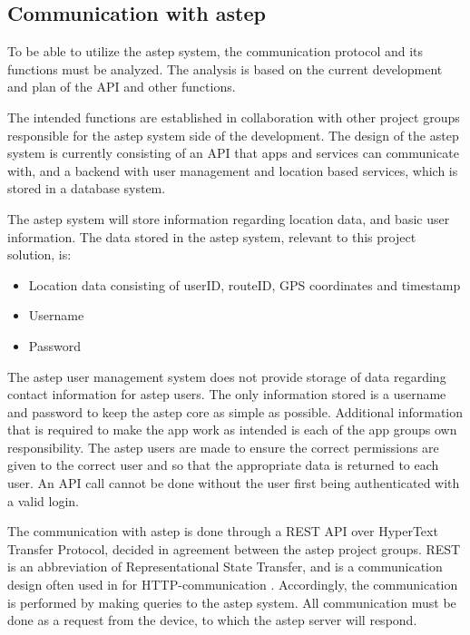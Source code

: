 \subsection{Communication with \gls{astep}}\label{ssec:communicationwithastep}
To be able to utilize the \gls{astep} system, the communication protocol and its functions must be analyzed. 
The analysis is based on the current development and plan of the API and other functions.

The intended functions are established in collaboration with other project groups responsible for the \gls{astep} system side of the development. 
The design of the \gls{astep} system is currently consisting of an API that apps and services can communicate with, and a backend with user management and location based services, which is stored in a database system.

The \gls{astep} system will store information regarding location data, and basic user information. 
The data stored in the \gls{astep} system, relevant to this project solution, is:
\begin{itemize}
	\item Location data consisting of userID, routeID, GPS coordinates and timestamp
	\item Username
	\item Password
\end{itemize}

The \gls{astep} user management system does not provide storage of data regarding contact information for \gls{astep} users.
The only information stored is a username and password to keep the \gls{astep} core as simple as possible.
Additional information that is required to make the app work as intended is each of the app groups own responsibility.
The \gls{astep} users are made to ensure the correct permissions are given to the correct user and so that the appropriate data is returned to each user.
An API call cannot be done without the user first being authenticated with a valid login.

The communication with \gls{astep} is done through a REST API over HyperText Transfer Protocol, decided in agreement between the \gls{astep} project groups.
REST is an abbreviation of Representational State Transfer, and is a communication design often used in for HTTP-communication \cite{REST}.
Accordingly, the communication is performed by making queries to the \gls{astep} system. 
All communication must be done as a request from the device, to which the \gls{astep} server will respond.

